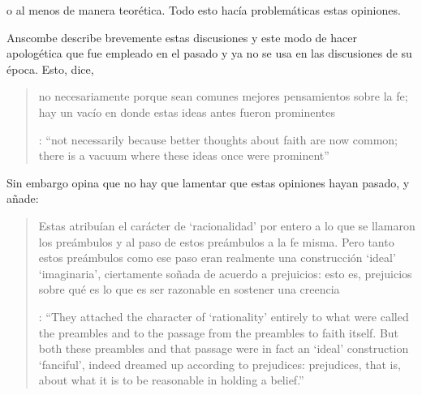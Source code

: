 o al menos de manera teorética. Todo esto hacía problemáticas estas opiniones.

Anscombe describe brevemente estas discusiones y este modo de hacer apologética que fue empleado en el pasado y ya no se usa en las discusiones de su época. Esto, dice, \blockquote[{\cite[114]{anscombe1981erp:faith}}: \enquote{not necessarily because better thoughts about faith are now common; there is a vacuum where these ideas once were prominent}]{no necesariamente porque sean comunes mejores pensamientos sobre la fe; hay un vacío en donde estas ideas antes fueron prominentes}. Sin embargo opina que no hay que lamentar que estas opiniones hayan pasado, y añade: \blockquote[{\cite[114]{anscombe1981erp:faith}}: \enquote{They attached the character of `rationality' entirely to what were called the preambles and to the passage from the preambles to faith itself. But both these preambles and that passage were in fact an `ideal' construction \textelp{} `fanciful', indeed dreamed up according to prejudices: prejudices, that is, about what it is to be reasonable in holding a belief.}]{Estas atribuían el carácter de `racionalidad' por entero a lo que se llamaron los preámbulos y al paso de estos preámbulos a la fe misma. Pero tanto estos preámbulos como ese paso eran realmente una construcción `ideal' \textelp{} `imaginaria', ciertamente soñada de acuerdo a prejuicios: esto es, prejuicios sobre qué es lo que es ser razonable en sostener una creencia}.

